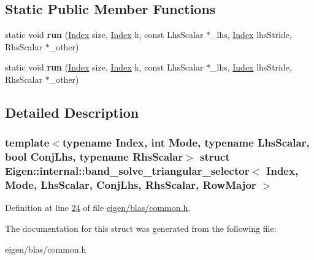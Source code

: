 \subsection*{Static Public Member Functions}
\begin{DoxyCompactItemize}
\item 
\mbox{\label{struct_eigen_1_1internal_1_1band__solve__triangular__selector_3_01_index_00_01_mode_00_01_lhs_scb3f84b84f0cb728030fb1bbaaacae5f9_afccff75dfb8265d30eb0b7fe24605bbd}} 
static void {\bfseries run} (\hyperlink{namespace_eigen_a62e77e0933482dafde8fe197d9a2cfde}{Index} size, \hyperlink{namespace_eigen_a62e77e0933482dafde8fe197d9a2cfde}{Index} k, const Lhs\+Scalar $\ast$\+\_\+lhs, \hyperlink{namespace_eigen_a62e77e0933482dafde8fe197d9a2cfde}{Index} lhs\+Stride, Rhs\+Scalar $\ast$\+\_\+other)
\item 
\mbox{\label{struct_eigen_1_1internal_1_1band__solve__triangular__selector_3_01_index_00_01_mode_00_01_lhs_scb3f84b84f0cb728030fb1bbaaacae5f9_afccff75dfb8265d30eb0b7fe24605bbd}} 
static void {\bfseries run} (\hyperlink{namespace_eigen_a62e77e0933482dafde8fe197d9a2cfde}{Index} size, \hyperlink{namespace_eigen_a62e77e0933482dafde8fe197d9a2cfde}{Index} k, const Lhs\+Scalar $\ast$\+\_\+lhs, \hyperlink{namespace_eigen_a62e77e0933482dafde8fe197d9a2cfde}{Index} lhs\+Stride, Rhs\+Scalar $\ast$\+\_\+other)
\end{DoxyCompactItemize}


\subsection{Detailed Description}
\subsubsection*{template$<$typename Index, int Mode, typename Lhs\+Scalar, bool Conj\+Lhs, typename Rhs\+Scalar$>$\newline
struct Eigen\+::internal\+::band\+\_\+solve\+\_\+triangular\+\_\+selector$<$ Index, Mode, Lhs\+Scalar, Conj\+Lhs, Rhs\+Scalar, Row\+Major $>$}



Definition at line \hyperlink{eigen_2blas_2common_8h_source_l00024}{24} of file \hyperlink{eigen_2blas_2common_8h_source}{eigen/blas/common.\+h}.



The documentation for this struct was generated from the following file\+:\begin{DoxyCompactItemize}
\item 
eigen/blas/common.\+h\end{DoxyCompactItemize}
